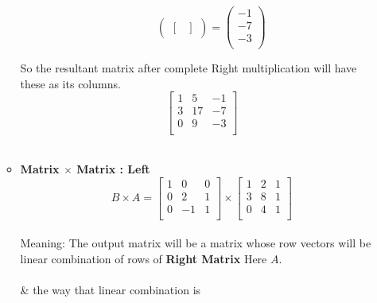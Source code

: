 \documentclass[a4paper,11pt]{article}
\numberwithin{equation}{section}
\begin{document}
\begin{itemize}
\begin{itemize}
\begin{itemize}
\[\begin{pmatrix}
\begin{bmatrix}
                        \end{bmatrix}
                    \end{pmatrix}
                    =
                    \begin{pmatrix}
                        -1\\
                        -7\\
                        -3\\
                    \end{pmatrix}
                    \]
                \end{itemize}
            So the resultant matrix after complete Right multiplication will have these as its columns.
            \begin{equation}
                \begin{bmatrix}
                    1 & 5 & -1\\
                    3 & 17 & -7 \\
                    0 & 9 & -3\\
                \end{bmatrix}
            \end{equation}\\
        \item \textbf{Matrix $\times$ Matrix : Left}
        \begin{equation}
            B \times A=
            \begin{bmatrix}
                1 & 0 & 0 \\
                0 & 2 & 1 \\
                0 & -1 & 1 \\
            \end{bmatrix} \times
            \begin{bmatrix}
                1 & 2 & 1 \\
                3 & 8 & 1 \\
                0 & 4 & 1 \\
            \end{bmatrix}
        \end{equation}\\
            
        Meaning: The output matrix will be a matrix whose row vectors will be linear combination of rows of \textbf{Right Matrix} Here $A$.\\
        \hspace{5cm} \\
        \& the way that linear combination is\\


\end{itemize}
\end{itemize}
\end{document}
